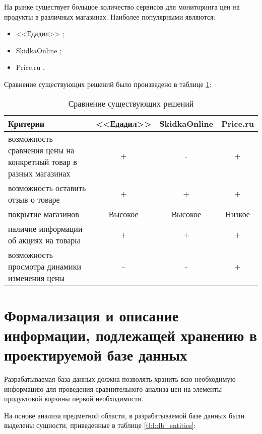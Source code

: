 На рынке существует большое количество сервисов для мониторинга цен на продукты в различных магазинах. Наиболее популярными являются:

\begin{itemize}[label=--]
	\item <<Едадил>> \cite{info_edadil};
	\item SkidkaOnline \cite{info_skidka_online};
	\item Price.ru \cite{info_price_ru}.
\end{itemize}

Сравнение существующих решений было произведено в таблице \ref{tbl:exist_sol}:

\begin{table}[ht]
	\begin{center}
		\begin{threeparttable}
			\caption{Сравнение существующих решений}
			\label{tbl:exist_sol}
			\begin{tabular}{|p{7cm}|c|c|c|}
				\hline
				\textbf{Критерии} & <<Едадил>> & SkidkaOnline & Price.ru \\
				\hline
				возможность сравнения цены на конкретный товар в разных магазинах & + & - & + \\
				\hline
				возможность оставить отзыв о товаре & + & + & + \\
				\hline
				покрытие магазинов & Высокое & Высокое & Низкое \\
				\hline
				наличие информации об акциях на товары & + & + & + \\
				\hline
				возможность просмотра динамики изменения цены & - & - & + \\
				\hline
			\end{tabular}
		\end{threeparttable}			
	\end{center}
\end{table}

\section{Формализация и описание информации, подлежащей хранению в проектируемой базе данных}

Разрабатываемая база данных должна позволять хранить всю необходимую информацию для проведения сравнительного анализа цен на элементы продуктовой корзины первой необходимости. 

На основе анализа предметной области, в разрабатываемой базе данных были выделены сущности, приведенные в таблице \ref{tbl:db_entities}: 

